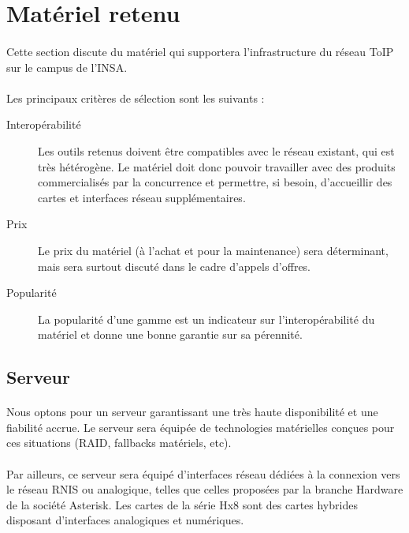 \section{Matériel retenu}

\paragraph{} Cette section discute du matériel qui supportera l'infrastructure
du réseau ToIP sur le campus de l'INSA.

\paragraph{} Les principaux critères de sélection sont les suivants :
\begin{description}
	\item[Interopérabilité] Les outils retenus doivent être compatibles avec le
	réseau existant, qui est très hétérogène. Le matériel doit donc pouvoir
	travailler avec des produits commercialisés par la concurrence et permettre,
	si besoin, d'accueillir des cartes et interfaces réseau supplémentaires.
	\item[Prix] Le prix du matériel (à l'achat et pour la maintenance) sera
  déterminant, mais sera surtout discuté dans le cadre d'appels d'offres.
	\item[Popularité] La popularité d'une gamme est un indicateur sur
  l'interopérabilité du matériel et donne une bonne garantie sur sa pérennité.
\end{description}

\subsection{Serveur}

\paragraph{} Nous optons pour un serveur garantissant une très haute
disponibilité et une fiabilité accrue. Le serveur sera équipée de technologies
matérielles conçues pour ces situations (RAID, fallbacks matériels, etc).

\paragraph{} Par ailleurs, ce serveur sera équipé d'interfaces réseau dédiées à
la connexion vers le réseau \ac{RNIS} ou analogique, telles que celles proposées
par la branche Hardware de la société Asterisk. Les cartes de la série Hx8 sont
des cartes hybrides disposant d'interfaces analogiques et numériques.

